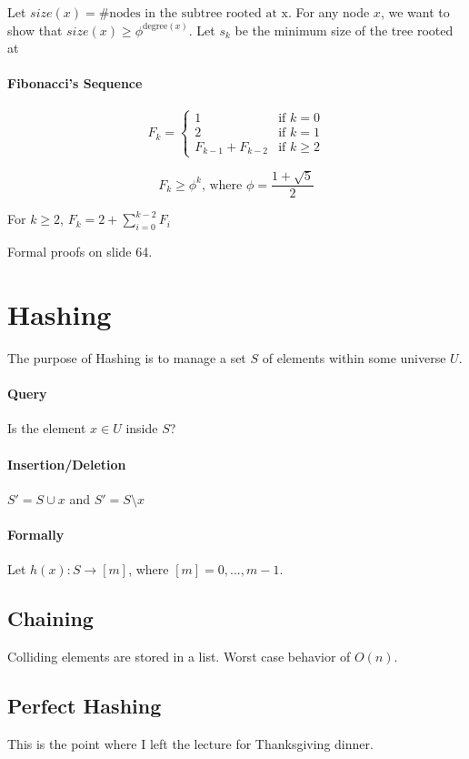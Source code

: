 \documentclass[a4paper]{article}
\begin{document}
Let $size(x)=\text{\# nodes in the subtree rooted at x}$.
For any node $x$, we want to show that $size(x)\ge \phi^{\text{degree}(x)}$.
Let $s_k$ be the minimum size of the tree rooted at 

\paragraph{Fibonacci's Sequence}

\[
F_k=
\begin{cases}
1 & \text{if }k=0 \\
2 & \text{if }k=1 \\
F_{k-1}+F_{k-2} & \text{if }k\ge2
\end{cases}
\]

\[F_k\ge\phi^k\text{, where }\phi=\frac{1+\sqrt{5}}{2}\]

For $k\ge2$, $F_k=2+\sum_{i=0}^{k-2}F_i$


Formal proofs on slide 64.

\section{Hashing}
The purpose of Hashing is to manage a set $S$ of elements within some universe $U$.

\paragraph{Query}
Is the element $x\in U$ inside $S$?

\paragraph{Insertion/Deletion}
$S'=S\cup{x}$ and $S'=S\setminus x$

\paragraph{Formally}
Let $h(x):S\to [m]$, where $[m]={0,...,m-1}$.

\subsection{Chaining}
Colliding elements are stored in a list. Worst case behavior of $O(n)$.

\subsection{Perfect Hashing}

This is the point where I left the lecture for Thanksgiving dinner.
\end{document}
